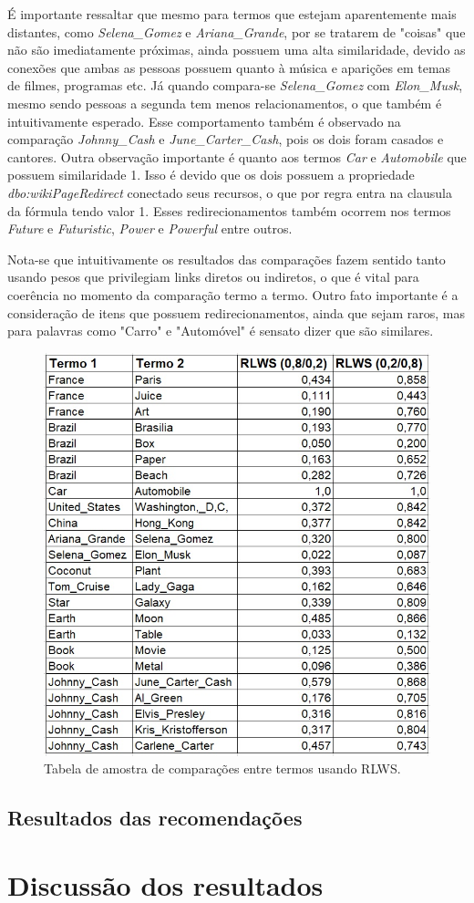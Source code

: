 É importante ressaltar que mesmo para termos que estejam aparentemente mais distantes, como \textit{Selena\_Gomez} e \textit{Ariana\_Grande}, por se tratarem de "coisas" que não são imediatamente próximas, ainda possuem uma alta similaridade, devido as conexões que ambas as pessoas possuem quanto à música e aparições em temas de filmes, programas etc. Já quando compara-se \textit{Selena\_Gomez} com \textit{Elon\_Musk}, mesmo sendo pessoas a segunda tem menos relacionamentos, o que também é intuitivamente esperado. Esse comportamento também é observado na comparação \textit{Johnny\_Cash} e \textit{June\_Carter\_Cash}, pois os dois foram casados e cantores. Outra observação importante é quanto aos termos \textit{Car} e \textit{Automobile} que possuem similaridade 1. Isso é devido que os dois possuem a propriedade \textit{dbo:wikiPageRedirect} conectado seus recursos, o que por regra entra na clausula da fórmula tendo valor 1. Esses redirecionamentos também ocorrem nos  termos \textit{Future} e \textit{Futuristic}, \textit{Power} e \textit{Powerful} entre outros.

Nota-se que intuitivamente os resultados das comparações fazem sentido tanto usando pesos que privilegiam links diretos ou indiretos, o que é vital para coerência no momento da comparação termo a termo. Outro fato importante é a consideração de itens que possuem redirecionamentos, ainda que sejam raros, mas para palavras como "Carro" e "Automóvel" é sensato dizer que são similares.

\begin{figure}
	\centering
	\includegraphics[scale=0.7]{imagens/rlws_results.jpg}
	\caption{Tabela de amostra de comparações entre termos usando \ac{RLWS}.}
	\label{fig:rlws_results}
\end{figure}

\subsection{Resultados das recomendações}

\section{Discussão dos resultados}

\label{cap:evaluation}
